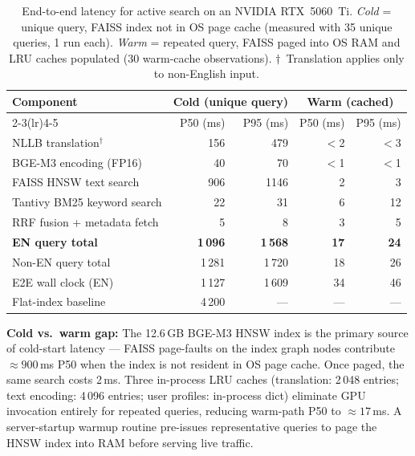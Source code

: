 \begin{table}[tbp]
\caption{End-to-end latency for active search on an NVIDIA RTX~5060~Ti.
         \emph{Cold} = unique query, FAISS index not in OS page cache
         (measured with 35 unique queries, 1 run each).
         \emph{Warm} = repeated query, FAISS paged into OS RAM and
         LRU caches populated (30 warm-cache observations).
         $\dagger$~Translation applies only to non-English input.}
\label{tab:latency}
\centering
\begin{tabular}{lrrrr}
\toprule
\multirow{2}{*}{\textbf{Component}}
  & \multicolumn{2}{c}{\textbf{Cold (unique query)}}
  & \multicolumn{2}{c}{\textbf{Warm (cached)}} \\
\cmidrule(lr){2-3}\cmidrule(lr){4-5}
  & P50 (ms) & P95 (ms) & P50 (ms) & P95 (ms) \\
\midrule
NLLB translation$^\dagger$  & 156  & 479  & $<$2   & $<$3  \\
BGE-M3 encoding (FP16)      & 40   & 70   & $<$1   & $<$1  \\
FAISS HNSW text search      & 906  & 1146 & 2      & 3     \\
Tantivy BM25 keyword search & 22   & 31   & 6      & 12    \\
RRF fusion + metadata fetch & 5    & 8    & 3      & 5     \\
\midrule
\textbf{EN query total}     & \textbf{1\,096} & \textbf{1\,568} & \textbf{17} & \textbf{24} \\
Non-EN query total          & 1\,281          & 1\,720          & 18          & 26          \\
\midrule
E2E wall clock (EN)         & 1\,127          & 1\,609          & 34          & 46          \\
\midrule
Flat-index baseline         & 4\,200          & ---             & ---         & ---         \\
\bottomrule
\end{tabular}
\smallskip

\noindent\footnotesize
\textbf{Cold vs.\ warm gap:} The 12.6\,GB BGE-M3 HNSW index is the primary
source of cold-start latency — FAISS page-faults on the index graph nodes
contribute ${\approx}900$\,ms P50 when the index is not resident in OS page cache.
Once paged, the same search costs 2\,ms.
Three in-process LRU caches (translation: 2\,048 entries; text encoding:
4\,096 entries; user profiles: in-process dict) eliminate GPU invocation
entirely for repeated queries, reducing warm-path P50 to ${\approx}17$\,ms.
A server-startup warmup routine pre-issues representative queries to page
the HNSW index into RAM before serving live traffic.
\end{table}
